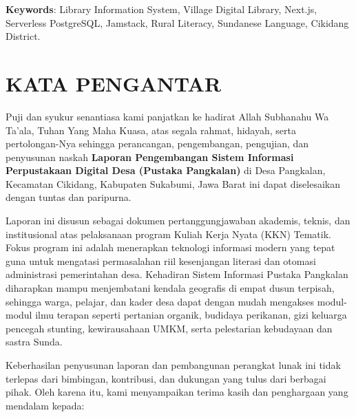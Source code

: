 \documentclass[
  indonesian,
  12pt,
]{report}
\begin{document}
\textbf{Keywords}: Library Information System, Village Digital Library,
Next.js, Serverless PostgreSQL, Jamstack, Rural Literacy, Sundanese
Language, Cikidang District.

\newpage

\chapter*{KATA PENGANTAR}\label{kata-pengantar}

Puji dan syukur senantiasa kami panjatkan ke hadirat Allah Subhanahu Wa
Ta'ala, Tuhan Yang Maha Kuasa, atas segala rahmat, hidayah, serta
pertolongan-Nya sehingga perancangan, pengembangan, pengujian, dan
penyusunan naskah \textbf{Laporan Pengembangan Sistem Informasi
Perpustakaan Digital Desa (Pustaka Pangkalan)} di Desa Pangkalan,
Kecamatan Cikidang, Kabupaten Sukabumi, Jawa Barat ini dapat
diselesaikan dengan tuntas dan paripurna.

Laporan ini disusun sebagai dokumen pertanggungjawaban akademis, teknis,
dan institusional atas pelaksanaan program Kuliah Kerja Nyata (KKN)
Tematik. Fokus program ini adalah menerapkan teknologi informasi modern
yang tepat guna untuk mengatasi permasalahan riil kesenjangan literasi
dan otomasi administrasi pemerintahan desa. Kehadiran Sistem Informasi
Pustaka Pangkalan diharapkan mampu menjembatani kendala geografis di
empat dusun terpisah, sehingga warga, pelajar, dan kader desa dapat
dengan mudah mengakses modul-modul ilmu terapan seperti pertanian
organik, budidaya perikanan, gizi keluarga pencegah stunting,
kewirausahaan UMKM, serta pelestarian kebudayaan dan sastra Sunda.

Keberhasilan penyusunan laporan dan pembangunan perangkat lunak ini
tidak terlepas dari bimbingan, kontribusi, dan dukungan yang tulus dari
berbagai pihak. Oleh karena itu, kami menyampaikan terima kasih dan
penghargaan yang mendalam kepada:
\end{document}
